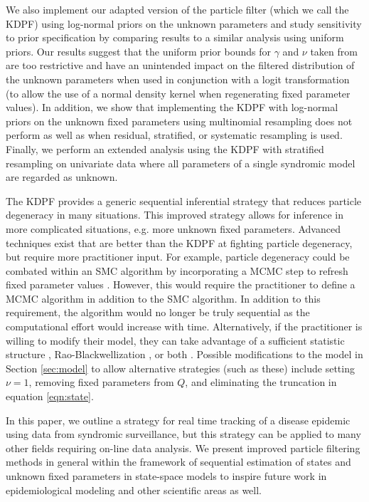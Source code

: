 We also implement our adapted version of the \citet{Liu:West:comb:2001} particle filter (which we call the KDPF) using log-normal priors on the unknown parameters and study sensitivity to prior specification by comparing results to a similar analysis using uniform priors. Our results suggest that the uniform prior bounds for $\gamma$ and $\nu$ taken from \citet{skvortsov2012monitoring} are too restrictive and have an unintended impact on the filtered distribution of the unknown parameters when used in conjunction with a logit transformation (to allow the use of a normal density kernel when regenerating fixed parameter values). In addition, we show that implementing the KDPF with log-normal priors on the unknown fixed parameters using multinomial resampling does not perform as well as when residual, stratified, or systematic resampling is used. Finally, we perform an extended analysis using the KDPF with stratified resampling on univariate data where all parameters of a single syndromic model are regarded as unknown.

The KDPF provides a generic sequential inferential strategy that reduces particle degeneracy in many situations. This improved strategy allows for inference in more complicated situations, e.g. more unknown fixed parameters. Advanced techniques exist that are better than the KDPF at fighting particle degeneracy, but require more practitioner input. For example, particle degeneracy could be combated within an SMC algorithm by incorporating a MCMC step to refresh fixed parameter values \citep{Gilk:Berz:foll:2001,Stor:part:2002}. However, this would require the practitioner to define a MCMC algorithm in addition to the SMC algorithm. In addition to this requirement, the algorithm would no longer be truly sequential as the computational effort would increase with time. Alternatively, if the practitioner is willing to modify their model, they can take advantage of a sufficient statistic structure \citep{Fear:mark:2002}, Rao-Blackwellization \citep{Douc:Gods:Andr:on:2000}, or both \citep{carvalho2010particle}. Possible modifications to the model in Section \ref{sec:model} to allow alternative strategies (such as these) include setting $\nu=1$, removing fixed parameters from $Q$, and eliminating the truncation in equation \eqref{eqn:state}.

In this paper, we outline a strategy for real time tracking of a disease epidemic using data from syndromic surveillance, but this strategy can be applied to many other fields requiring on-line data analysis. We present improved particle filtering methods in general within the framework of sequential estimation of states and unknown fixed parameters in state-space models to inspire future work in epidemiological modeling and other scientific areas as well. 